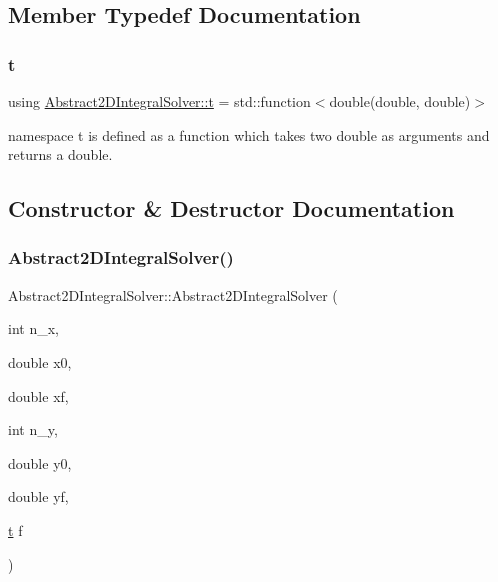 \subsection{Member Typedef Documentation}
\mbox{\label{class_abstract2_d_integral_solver_ab660df32953c6b0f9f3a45a8720eaeb3}} 
\subsubsection{\texorpdfstring{t}{t}}
{\footnotesize\ttfamily using \hyperlink{class_abstract2_d_integral_solver_ab660df32953c6b0f9f3a45a8720eaeb3}{Abstract2\+D\+Integral\+Solver\+::t} =  std\+::function$<$double(double, double)$>$}

namespace t is defined as a function which takes two double as arguments and returns a double. 

\subsection{Constructor \& Destructor Documentation}
\mbox{\label{class_abstract2_d_integral_solver_ad25b34f07befbbad7d3ec2b76d47b2b7}} 
\subsubsection{\texorpdfstring{Abstract2\+D\+Integral\+Solver()}{Abstract2DIntegralSolver()}}
{\footnotesize\ttfamily Abstract2\+D\+Integral\+Solver\+::\+Abstract2\+D\+Integral\+Solver (\begin{DoxyParamCaption}\item[{int}]{n\+\_\+x,  }\item[{double}]{x0,  }\item[{double}]{xf,  }\item[{int}]{n\+\_\+y,  }\item[{double}]{y0,  }\item[{double}]{yf,  }\item[{\hyperlink{class_abstract2_d_integral_solver_ab660df32953c6b0f9f3a45a8720eaeb3}{t}}]{f }\end{DoxyParamCaption})}

